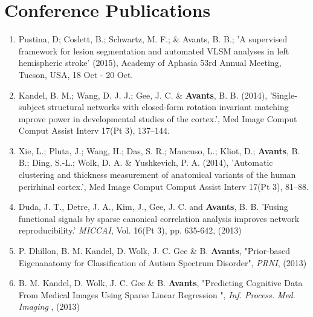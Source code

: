 \documentclass[11pt]{moderncv} %
\begin{document}
\section{Conference Publications}
\begin{enumerate}
\item Pustina, D; Coslett, B.; Schwartz, M. F.; \& Avants, B. B.;
'A supervised framework for lesion segmentation and automated VLSM analyses in left hemispheric stroke' (2015), Academy of Aphasia 53rd Annual Meeting, Tucson, USA, 18 Oct - 20 Oct.

\item Kandel, B. M.; Wang, D. J. J.; Gee, J. C. \& \textbf{Avants}, B. B. (2014), 'Single-subject structural networks with closed-form rotation invariant matching mprove power in developmental studies of the cortex.', Med Image Comput Comput Assist Interv 17(Pt 3), 137--144.

\item Xie, L.; Pluta, J.; Wang, H.; Das, S. R.; Mancuso, L.; Kliot, D.; \textbf{Avants}, B. B.; Ding, S.-L.; Wolk, D. A. \& Yushkevich, P. A. (2014), 'Automatic clustering and thickness measurement of anatomical variants of the human perirhinal cortex.', Med Image Comput Comput Assist Interv 17(Pt 3), 81--88.

\item Duda, J. T., Detre, J. A., Kim, J., Gee, J. C. and \textbf{Avants}, B. B.
'Fusing functional signals by sparse canonical correlation analysis
improves network reproducibility.'  {\em MICCAI}, Vol. 16(Pt 3), pp. 635-642, (2013)

\item P. Dhillon, B. M. Kandel, D. Wolk, J. C. Gee \&  B. \textbf{Avants},
"Prior-based Eigenanatomy for Classification of Autism Spectrum Disorder",
{\em PRNI}, (2013)

\item B. M. Kandel, D. Wolk, J. C. Gee \&  B. \textbf{Avants},
"Predicting Cognitive Data From Medical Images Using Sparse Linear Regression ",
{\em Inf. Process. Med. Imaging}
, (2013)


\end{enumerate}
\end{document}
